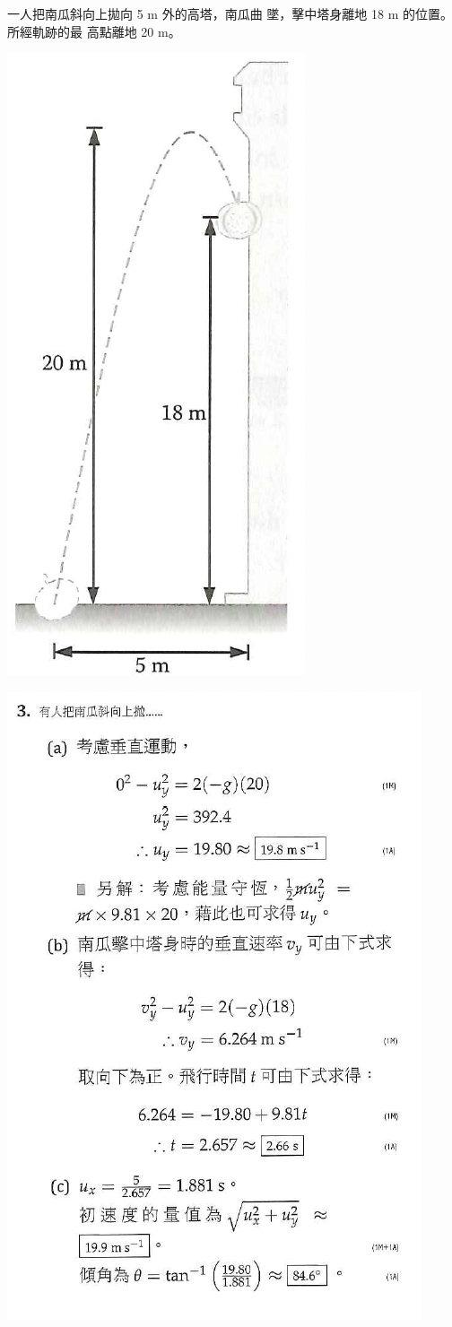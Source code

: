 {
一人把南瓜斜向上拋向 5 m 外的高塔，南瓜曲 墜，擊中塔身離地 18 m 的位置。所經軌跡的最 高點離地 20 m。
{\par\centering
\includegraphics[width=0.2\linewidth]{assets/dwdqw.png}\par}
\clearpage{}
}{\par{\par\includegraphics[width=0.75\linewidth]{assets/wqq2ge.png}}}